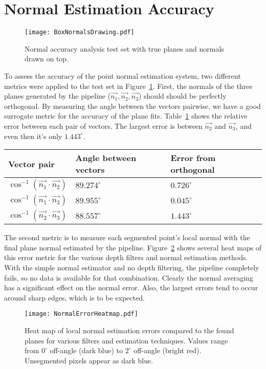 \section{Normal Estimation Accuracy}
\begin{figure}[!htpb]
    \centering
    \texttt{[image: BoxNormalsDrawing.pdf]}
    \caption{Normal accuracy analysis test set with true planes and normals drawn on top.}
    \label{fig:boxnormalsdrawing}
\end{figure}
To assess the accuracy of the point normal estimation system, two different metrics were applied to the test set in Figure~\ref{fig:boxnormalsdrawing}. First, the normals of the three planes generated by the pipeline ($\vec{n_1},\vec{n_2},\vec{n_3}$) should should be perfectly orthogonal. By measuring the angle between the vectors pairwise, we have a good surrogate metric for the accuracy of the plane fits. Table~\ref{table:orthonormalerror} shows the relative error between each pair of vectors. The largest error is between  $\vec{n_2}$  and $\vec{n_3}$, and even then it's only $1.443^{\circ}$.
\begin{table}[h]
\label{table:orthonormalerror}
\begin{tabular}{|l|l|l|}
\hline
Vector pair                             & Angle between vectors            & Error from orthogonal           \\ \hline
$\cos^{-1}(\vec{n_1} \cdot  \vec{n_2})$ & $89.274^{\circ}$ & $0.726^{\circ}$ \\ \hline
$\cos^{-1}(\vec{n_1} \cdot  \vec{n_3})$ & $89.955^{\circ}$ & $0.045^{\circ}$ \\ \hline
$\cos^{-1}(\vec{n_2} \cdot  \vec{n_3})$ & $88.557^{\circ}$ & $1.443^{\circ}$ \\ \hline
\end{tabular}
\end{table}

The second metric is to measure each segmented point's local normal with the final plane normal estimated by the pipeline. Figure~\ref{fig:normalheatmap} shows several heat maps of this error metric for the various depth filters and normal estimation methods. With the simple normal estimator and no depth filtering, the pipeline completely fails, so no data is available for that combination. Clearly the normal averaging has a significant effect on the normal error. Also, the largest errors tend to occur around sharp edges, which is to be expected.

\begin{figure}[!htpb]
    \centering
    \texttt{[image: NormalErrorHeatmap.pdf]}
    \caption{Heat map of local normal estimation errors compared to the found planes for various filters and estimation techniques. Values range from $0^{\circ}$ off-angle (dark blue) to $2^{\circ}$ off-angle (bright red). Unsegmented pixels appear as dark blue.}
    \label{fig:normalheatmap}
\end{figure}

